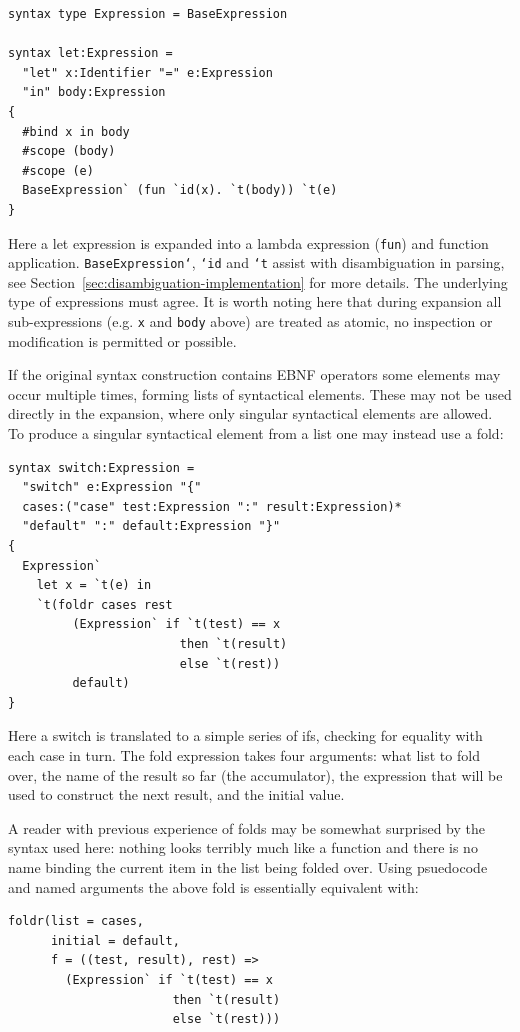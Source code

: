 \documentclass{kththesis}
\begin{document}
\begin{verbatim}
syntax type Expression = BaseExpression

syntax let:Expression =
  "let" x:Identifier "=" e:Expression
  "in" body:Expression
{
  #bind x in body
  #scope (body)
  #scope (e)
  BaseExpression` (fun `id(x). `t(body)) `t(e)
}
\end{verbatim}

Here a let expression is expanded into a lambda expression (\texttt{fun}) and function application. \texttt{BaseExpression`}, \texttt{`id} and \texttt{`t} assist with disambiguation in parsing, see Section~\ref{sec:disambiguation-implementation} for more details. The underlying type of expressions must agree. It is worth noting here that during expansion all sub-expressions (e.g. \texttt{x} and \texttt{body} above) are treated as atomic, no inspection or modification is permitted or possible.

If the original syntax construction contains EBNF operators some elements may occur multiple times, forming lists of syntactical elements. These may not be used directly in the expansion, where only singular syntactical elements are allowed. To produce a singular syntactical element from a list one may instead use a fold:

\begin{verbatim}
syntax switch:Expression =
  "switch" e:Expression "{"
  cases:("case" test:Expression ":" result:Expression)*
  "default" ":" default:Expression "}"
{
  Expression`
    let x = `t(e) in
    `t(foldr cases rest
         (Expression` if `t(test) == x
                        then `t(result)
                        else `t(rest))
         default)
}
\end{verbatim}

Here a switch is translated to a simple series of ifs, checking for equality with each case in turn. The fold expression takes four arguments: what list to fold over, the name of the result so far (the accumulator), the expression that will be used to construct the next result, and the initial value.

A reader with previous experience of folds may be somewhat surprised by the syntax used here: nothing looks terribly much like a function and there is no name binding the current item in the list being folded over. Using psuedocode and named arguments the above fold is essentially equivalent with:

\begin{verbatim}
foldr(list = cases,
      initial = default,
      f = ((test, result), rest) =>
        (Expression` if `t(test) == x
                       then `t(result)
                       else `t(rest)))
\end{verbatim}
\end{document}
